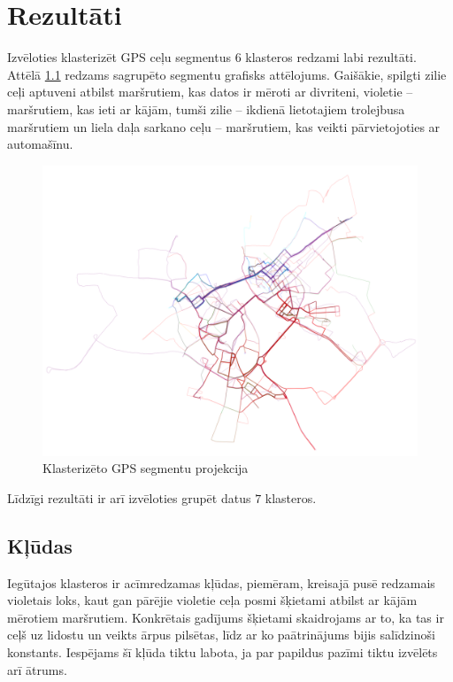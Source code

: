 \documentclass{ludis}
\begin{document}
\chapter{Rezultāti}
Izvēloties klasterizēt GPS ceļu segmentus $6$ klasteros redzami labi rezultāti. Attēlā 
\ref{fig:clustered_trails} \linebreak redzams sagrupēto segmentu grafisks attēlojums. Gaišākie, 
spilgti zilie ceļi aptuveni atbilst maršrutiem, kas datos ir mēroti ar divriteni, violetie -- 
maršrutiem, kas ieti ar kājām, tumši zilie -- ikdienā lietotajiem trolejbusa maršrutiem un liela daļa
sarkano ceļu -- maršrutiem, kas veikti pārvietojoties ar automašīnu.

\begin{figure}
  \centering
  \includegraphics[scale=0.45]{img/clustered_trails}
  \caption{Klasterizēto GPS segmentu projekcija}
  \label{fig:clustered_trails}
\end{figure}

Līdzīgi rezultāti ir arī izvēloties grupēt datus $7$ klasteros.

\section{Kļūdas}
Iegūtajos klasteros ir acīmredzamas kļūdas, piemēram, kreisajā pusē redzamais violetais loks, kaut
gan pārējie violetie ceļa posmi šķietami atbilst ar kājām mērotiem maršrutiem. Konkrētais gadījums
šķietami skaidrojams ar to, ka tas ir ceļš uz lidostu un veikts ārpus pilsētas, līdz ar ko
paātrinājums bijis salīdzinoši konstants. Iespējams šī kļūda tiktu labota, ja 
par \linebreak papildus pazīmi tiktu izvēlēts arī ātrums.
\end{document}
